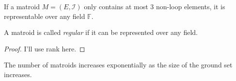 \begin{thm}
If a matroid $M = (E, \mathcal{I})$ only contains at most 3 non-loop elements, it is representable over any field $\mathbb{F}$.
\end{thm}

A matroid is called \textit{regular} if it can be represented over any field.

\begin{proof}
I'll use rank here.
\end{proof}

The number of matroids increases exponentially as the size of the ground set increases.

